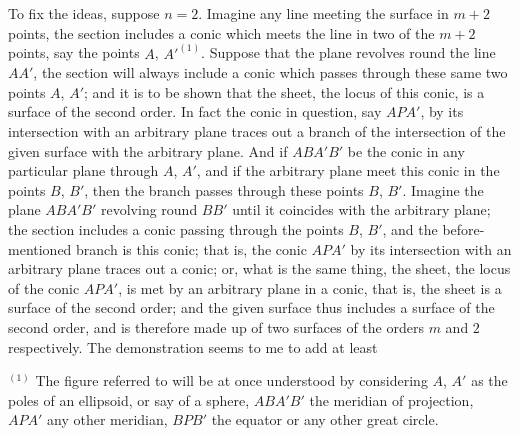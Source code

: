 \documentclass[11pt,a4paper]{article}
\theoremstyle{plain}
\begin{document}
To fix the ideas, suppose $n = 2$. Imagine any line meeting the surface in $m+2$ points, the section includes a conic which meets the line in two of the $m+2$ points, say the points $A$, $A'^{(1)}$. Suppose that the plane revolves round the line $AA'$, the section will always include a conic which passes through these same two points $A$, $A'$; and it is to be shown that the sheet, the locus of this conic, is a surface of the second order. In fact the conic in question, say $APA'$, by its intersection with an arbitrary plane traces out a branch of the intersection of the given surface with the arbitrary plane. And if $ABA'B'$ be the conic in any particular plane through $A$, $A'$, and if the arbitrary plane meet this conic in the points $B$, $B'$, then the branch passes through these points $B$, $B'$. Imagine the plane $ABA'B'$ revolving round $BB'$ until it coincides with the arbitrary plane; the section includes a conic passing through the points $B$, $B'$, and the before-mentioned branch is this conic; that is, the conic $APA'$ by its intersection with an arbitrary plane traces out a conic; or, what is the same thing, the sheet, the locus of the conic $APA'$, is met by an arbitrary plane in a conic, that is, the sheet is a surface of the second order; and the given surface thus includes a surface of the second order, and is therefore made up of two surfaces of the orders $m$ and $2$ respectively. The demonstration seems to me to add at least

\medskip
\noindent $^{(1)}$ The figure referred to will be at once understood by considering $A$, $A'$ as the poles of an ellipsoid, or say of a sphere, $ABA'B'$ the meridian of projection, $APA'$ any other meridian, $BPB'$ the equator or any other great circle.

\newpage
\end{document}
